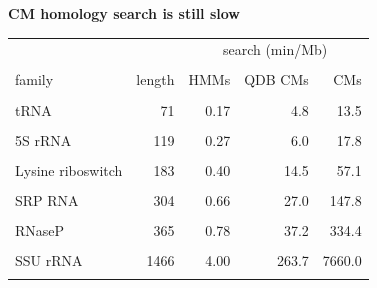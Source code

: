 \documentclass[landscape]{slides}
\begin{document}
\begin{slide}
\begin{center}
\textbf{CM homology search is still slow}
\end{center}

\small
\begin{center}
\small
\begin{tabular}{lr|rrr}
                  &        & \multicolumn{3}{c}{search (min/Mb)} \\
                  &        &        &        &         \\
family            & length & HMMs   & QDB CMs&    CMs  \\
                  &        &        &        &         \\
tRNA              & 71     &  0.17 &  4.8  &   13.5 \\
                  &        &        &        &         \\
5S rRNA           & 119    &  0.27 &  6.0  &   17.8 \\
                  &        &        &        &         \\
Lysine riboswitch & 183    &  0.40 &  14.5 &  57.1 \\
                  &        &        &        &         \\
SRP RNA           & 304    &  0.66 &  27.0 &  147.8 \\
                  &        &        &        &         \\
RNaseP            & 365    &  0.78 &  37.2 & 334.4  \\
                  &        &       &        &         \\
SSU rRNA          & 1466   &  4.00 & 263.7 &7660.0  \\
                  &        &        &        &         \\
\end{tabular}
\end{center}

\vfill

\end{slide}
\end{document}
